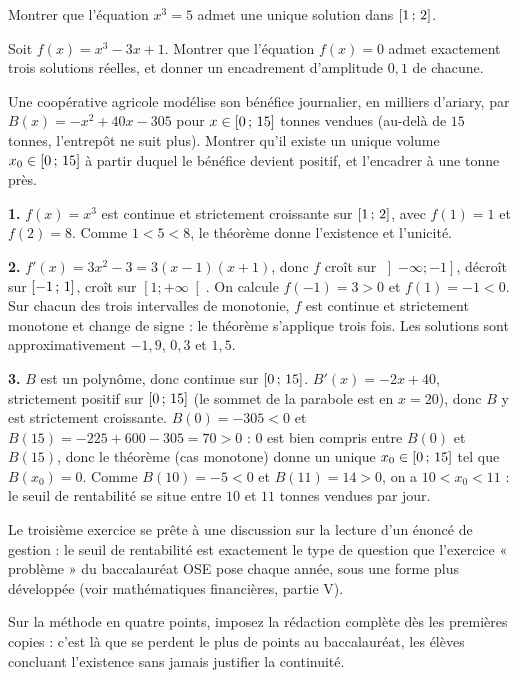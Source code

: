 \begin{entrainement}
\exo[\niveau{1}] Montrer que l'équation $x^{3} = 5$ admet une unique solution
dans $\left[1\,;\,2\right]$.

\exo[\niveau{2}] Soit $f(x) = x^{3} - 3x + 1$. Montrer que l'équation
$f(x) = 0$ admet exactement trois solutions réelles, et donner un encadrement
d'amplitude $0{,}1$ de chacune.

\exo[\niveau{3}] Une coopérative agricole modélise son bénéfice journalier, en
milliers d'ariary, par $B(x) = -x^{2} + 40x - 305$ pour $x \in \left[0\,;\,15\right]$
tonnes vendues (au-delà de $15$ tonnes, l'entrepôt ne suit plus). Montrer
qu'il existe un unique volume $x_{0} \in \left[0\,;\,15\right]$ à partir duquel
le bénéfice devient positif, et l'encadrer à une tonne près.
\end{entrainement}

\begin{corrige}
\textbf{1.} $f(x) = x^{3}$ est continue et strictement croissante sur
$\left[1\,;\,2\right]$, avec $f(1) = 1$ et $f(2) = 8$. Comme $1 < 5 < 8$, le
théorème donne l'existence et l'unicité.

\textbf{2.} $f'(x) = 3x^{2} - 3 = 3(x-1)(x+1)$, donc $f$ croît sur
$\left]-\infty ; -1\right]$, décroît sur $\left[-1\,;\,1\right]$, croît sur
$\left[1 ; +\infty\right[$. On calcule $f(-1) = 3 > 0$ et $f(1) = -1 < 0$.
Sur chacun des trois intervalles de monotonie, $f$ est continue et strictement
monotone et change de signe : le théorème s'applique trois fois. Les solutions
sont approximativement $-1{,}9$, $0{,}3$ et $1{,}5$.

\textbf{3.} $B$ est un polynôme, donc continue sur $\left[0\,;\,15\right]$.
$B'(x) = -2x+40$, strictement positif sur $\left[0\,;\,15\right]$ (le sommet de
la parabole est en $x=20$), donc $B$ y est strictement croissante. $B(0) = -305 < 0$
et $B(15) = -225+600-305 = 70 > 0$ : $0$ est bien compris entre $B(0)$ et
$B(15)$, donc le théorème (cas monotone) donne un unique
$x_{0} \in \left[0\,;\,15\right]$ tel que $B(x_{0}) = 0$. Comme $B(10) = -5 < 0$
et $B(11) = 14 > 0$, on a $10 < x_{0} < 11$ : le seuil de rentabilité se situe
entre $10$ et $11$ tonnes vendues par jour.
\end{corrige}

\begin{notepourlaclasse}
Le troisième exercice se prête à une discussion sur la lecture d'un énoncé de
gestion : le seuil de rentabilité est exactement le type de question que
l'exercice « problème » du baccalauréat OSE pose chaque année, sous une forme
plus développée (voir mathématiques financières, partie V).

Sur la méthode en quatre points, imposez la rédaction complète dès les
premières copies : c'est là que se perdent le plus de points au baccalauréat,
les élèves concluant l'existence sans jamais justifier la continuité.
\end{notepourlaclasse}


